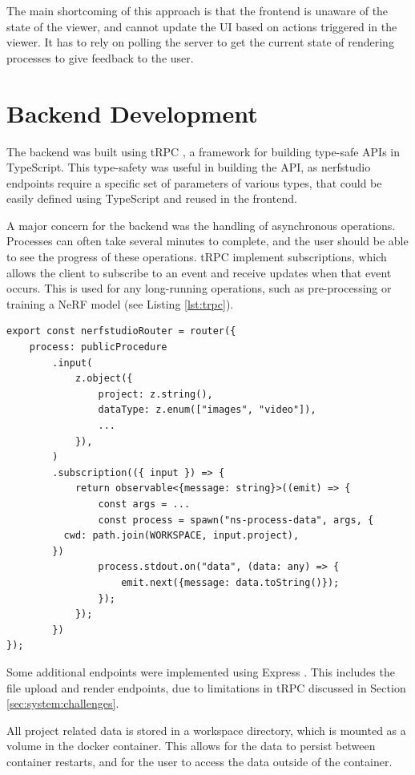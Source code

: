 The main shortcoming of this approach is that the frontend is unaware of the state of the viewer, and cannot update the UI based on actions triggered in the viewer.
It has to rely on polling the server to get the current state of rendering processes to give feedback to the user.

\section{Backend Development}
\label{sec:system:backend}

The backend was built using tRPC \cite{noauthor_trpc_nodate}, a framework for building type-safe APIs in TypeScript.
This type-safety was useful in building the API, as nerfstudio endpoints require a specific set of parameters of various types, that could be easily defined using TypeScript and reused in the frontend.

A major concern for the backend was the handling of asynchronous operations.
Processes can often take several minutes to complete, and the user should be able to see the progress of these operations.
tRPC implement subscriptions, which allows the client to subscribe to an event and receive updates when that event occurs.
This is used for any long-running operations, such as pre-processing or training a NeRF model (see Listing \ref{lst:trpc}).

\begin{lstlisting}[style=ES6, caption=Example tRPC endpoint for Pre-Processing returning a subscription., label=lst:trpc]
export const nerfstudioRouter = router({
	process: publicProcedure
		.input(
			z.object({
				project: z.string(),
				dataType: z.enum(["images", "video"]),
				...
			}),
		)
		.subscription(({ input }) => {
			return observable<{message: string}>((emit) => {
				const args = ...
				const process = spawn("ns-process-data", args, {
          cwd: path.join(WORKSPACE, input.project),
        })
				process.stdout.on("data", (data: any) => {
					emit.next({message: data.toString()});
				});
			});
		})
});
\end{lstlisting}

Some additional endpoints were implemented using Express \cite{noauthor_express_nodate}.
This includes the file upload and render endpoints, due to limitations in tRPC discussed in Section \ref{sec:system:challenges}.

All project related data is stored in a workspace directory, which is mounted as a volume in the docker container.
This allows for the data to persist between container restarts, and for the user to access the data outside of the container.

